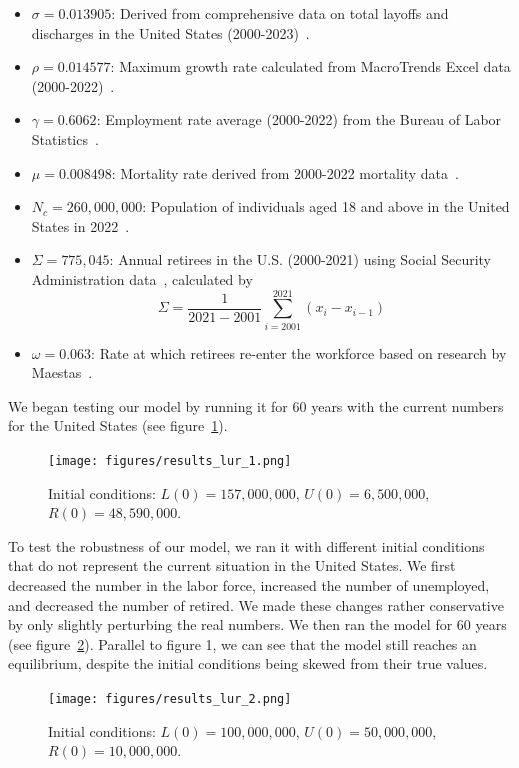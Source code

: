 \documentclass[11pt]{amsart}
\begin{document}
\begin{itemize}
    \item $\sigma = 0.013905$: Derived from comprehensive data on total layoffs and discharges in the United States (2000-2023)~\cite{FRED}.
    \item $\rho = 0.014577$: Maximum growth rate calculated from MacroTrends Excel data (2000-2022)~\cite{MacroTrends}.
    \item $\gamma = 0.6062$: Employment rate average (2000-2022) from the Bureau of Labor Statistics~\cite{BLS}.
    \item $\mu = 0.008498$: Mortality rate derived from 2000-2022 mortality data~\cite{usafacts}.
    \item $N_c = 260,000,000$: Population of individuals aged 18 and above in the United States in 2022~\cite{kidscount}.
    \item $\Sigma = 775,045$: Annual retirees in the U.S. (2000-2021) using Social Security Administration data~\cite{ssa}, calculated by
    \[
        \Sigma = \frac{1}{2021 - 2001}\sum_{i=2001}^{2021}(x_i - x_{i-1})
    \]
    \item $\omega = 0.063$: Rate at which retirees re-enter the workforce based on research by Maestas~\cite{maestas}.
\end{itemize}


We began testing our model by running it for 60 years with the current numbers for the United States (see figure~\ref{fig:results_lur_1}). 

\begin{figure}[h]
    \centering
    \texttt{[image: figures/results\_lur\_1.png]}
    \caption{Initial conditions: $L(0) = 157,000,000$, $U(0) = 6,500,000$, $R(0) = 48,590,000$.}
    \label{fig:results_lur_1}
\end{figure}

To test the robustness of our model, we ran it with different initial conditions that do not represent the current situation in the United States. 
We first decreased the number in the labor force, increased the number of unemployed, and decreased the number of retired. We made these changes rather conservative
by only slightly perturbing the real numbers. We then ran the model for 60 years (see figure~\ref{fig:results_lur_2}).
Parallel to figure 1, we can see that the model still reaches an equilibrium, despite the initial conditions being skewed from their true values.

\begin{figure}[h]
    \centering
    \texttt{[image: figures/results\_lur\_2.png]}
    \caption{Initial conditions: $L(0) = 100,000,000$, $U(0) = 50,000,000$, $R(0) = 10,000,000$.}
    \label{fig:results_lur_2}
\end{figure}
\end{document}
